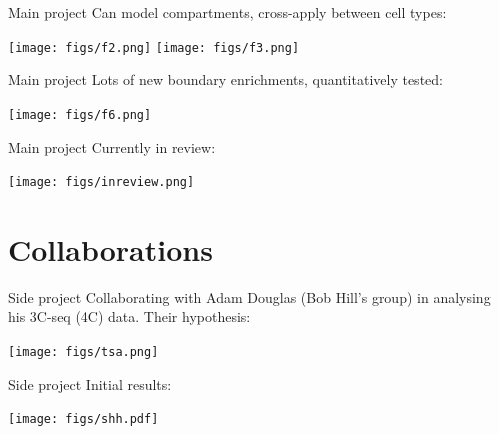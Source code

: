 \documentclass{beamer}
\begin{document}



\begin{frame}{Main project}
Can model compartments, cross-apply between cell types: \\

\vspace{2em}

\centering
\texttt{[image: figs/f2.png]}
\texttt{[image: figs/f3.png]}

\end{frame}

\begin{frame}{Main project}
Lots of new boundary enrichments, quantitatively tested: \\

\vspace{1em}

\centering
\texttt{[image: figs/f6.png]}

\end{frame}

\begin{frame}{Main project}
Currently in review: \\

\vspace{1em}

\centering

\texttt{[image: figs/inreview.png]}
\end{frame}

\section{Collaborations}
\begin{frame}{Side project}
Collaborating with Adam Douglas (Bob Hill's group) in analysing his
3C-seq (4C) data. Their hypothesis: \\

\vspace{1em}

\centering

\texttt{[image: figs/tsa.png]}
\end{frame}

\begin{frame}{Side project}
Initial results: \\

\vspace{1em}

\centering

\texttt{[image: figs/shh.pdf]} \\
\end{frame}
\end{document}
